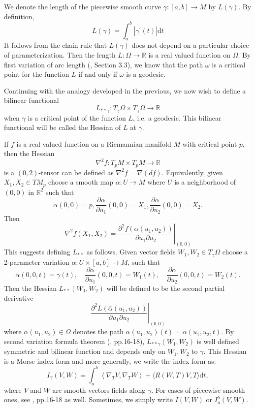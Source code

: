 \documentclass{ctexart}
\begin{document}
We denote the length of the piecewise smooth curve $\gamma:[a, b] \rightarrow M$ by $L(\gamma)$. By definition,
$$
L(\gamma)=\int_a^b|\gamma^{\prime}(t)| \mathrm{d} t
$$
It follows from the chain rule that $L(\gamma)$ does not depend on a particular choice of parameterization. Then the length $L: \Omega\rightarrow\mathbb{R}$ is a real valued 
function on $\Omega$. By first variation of arc length (\cite{ChenWeiHuan2002}, Section 3.3), we know that the path $\omega$ is a critical point for the function $L$ if and only if $\omega$ is a geodesic.

Continuing with the analogy developed in the previous, we now wish to define a bilinear functional
$$
L_{* * \gamma}: T_\gamma \Omega\times T_\gamma \Omega\rightarrow \mathbb{R}
$$
when $\gamma$ is a critical point of the function $L$, i.e. a geodesic. This bilinear functional will be called the Hessian of $L$ at $\gamma$.

If $f$ is a real valued function on a Riemannian manifold $M$ with critical point $p$, then the Hessian
$$
\nabla^2 f: T_p M \times T_p M \rightarrow \mathbb{R}
$$
is a $(0,2)$-tensor can be defined as $\nabla^2 f=\nabla(df)$. Equivalently, given $X_1, X_2 \in T M_p$ choose a smooth map
$\alpha: U\rightarrow M$ where $U$ is a neighborhood of $(0,0)$ in $\mathbb{R}^2$ such that 
$$
\alpha(0,0)=p, \frac{\partial \alpha}{\partial u_1}(0,0)=X_1, \frac{\partial \alpha}{\partial u_2}(0,0)=X_2 .
$$
Then
$$
\nabla^2 f\left(X_1, X_2\right)=\left.\frac{\partial^2 f\left(\alpha\left(u_1, u_2\right)\right)}{\partial u_1 \partial u_2}\right|_{(0,0)}
$$
This suggests defining $L_{* *}$ as follows. Given vector fields $W_1, W_2 \in T_\gamma\Omega$ choose a 2-parameter variation
$\alpha: U \times[a,b] \rightarrow M$, such that
$$
\alpha(0,0, t)=\gamma(t), \quad \frac{\partial \alpha}{\partial u_1}(0,0, t)=W_1(t), \quad \frac{\partial \alpha}{\partial u_2}(0,0, t)=W_2(t) .
$$
Then the Hessian $L_{* *}\left(W_1, W_2\right)$ will be defined to be the second partial derivative
$$
\left.\frac{\partial^2 L\left(\bar{\alpha}\left(u_1, u_2\right)\right)}{\partial u_1 \partial u_2}\right|_{(0,0)}
$$
where $\bar{\alpha}\left(u_1, u_2\right) \in \Omega$ denotes the path $\bar{\alpha}\left(u_1, u_2\right)(t)=\alpha\left(u_1, u_2, t\right)$. 
By second variation formula theorem (\cite{Cheeger2008}, pp.16-18), $L_{* * \gamma}(W_1,W_2)$ is well defined symmetric and bilinear function and depends only on $W_1,W_2$ to $\gamma$. 
This Hessian is a Morse index form and more generally, we write the index form as: 
$$
I_\gamma(V, W)=\int_a^b\left\langle\nabla_T V, \nabla_T W\right\rangle+\langle R(W, T) V, T\rangle\mathrm{d}t,
$$
where $V$ and $W$ are smooth vectors fields along $\gamma$. For cases of piecewise smooth ones, see \cite{Cheeger2008}, pp.16-18 as well. Sometimes, we simply write 
$I(V,W)$ or $I_a^b(V,W)$.
\end{document}
